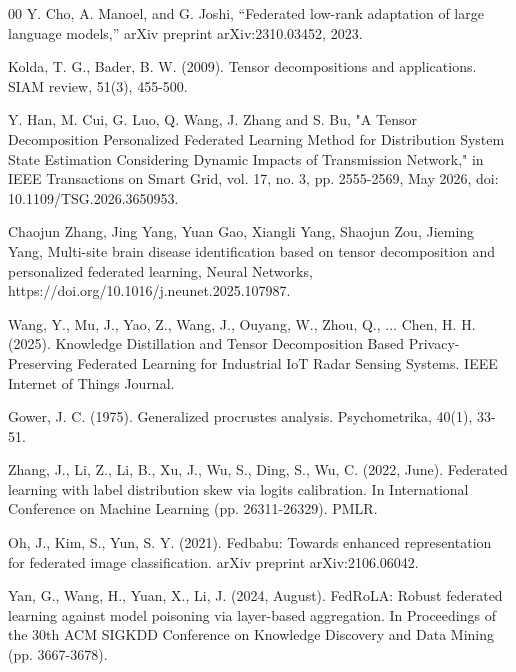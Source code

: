 \documentclass[conference]{IEEEtran}
\begin{document}
\begin{thebibliography}{00}
    Y. Cho, A. Manoel, and G. Joshi, ``Federated low-rank adaptation of large language models,'' arXiv preprint arXiv:2310.03452, 2023.
    
    Kolda, T. G., Bader, B. W. (2009). Tensor decompositions and applications. SIAM review, 51(3), 455-500.
    
    Y. Han, M. Cui, G. Luo, Q. Wang, J. Zhang and S. Bu, "A Tensor Decomposition Personalized Federated Learning Method for Distribution System State Estimation Considering Dynamic Impacts of Transmission Network," in IEEE Transactions on Smart Grid, vol. 17, no. 3, pp. 2555-2569, May 2026, doi: 10.1109/TSG.2026.3650953.
    
    Chaojun Zhang, Jing Yang, Yuan Gao, Xiangli Yang, Shaojun Zou, Jieming Yang, Multi-site brain disease identification based on tensor decomposition and personalized federated learning, Neural Networks, https://doi.org/10.1016/j.neunet.2025.107987.
    
    Wang, Y., Mu, J., Yao, Z., Wang, J., Ouyang, W., Zhou, Q., ... Chen, H. H. (2025). Knowledge Distillation and Tensor Decomposition Based Privacy-Preserving Federated Learning for Industrial IoT Radar Sensing Systems. IEEE Internet of Things Journal.
    
    Gower, J. C. (1975). Generalized procrustes analysis. Psychometrika, 40(1), 33-51.
    
    Zhang, J., Li, Z., Li, B., Xu, J., Wu, S., Ding, S., Wu, C. (2022, June). Federated learning with label distribution skew via logits calibration. In International Conference on Machine Learning (pp. 26311-26329). PMLR.
    
    Oh, J., Kim, S., Yun, S. Y. (2021). Fedbabu: Towards enhanced representation for federated image classification. arXiv preprint arXiv:2106.06042.
    
    Yan, G., Wang, H., Yuan, X., Li, J. (2024, August). FedRoLA: Robust federated learning against model poisoning via layer-based aggregation. In Proceedings of the 30th ACM SIGKDD Conference on Knowledge Discovery and Data Mining (pp. 3667-3678).
    
    
    

\end{thebibliography}
\end{document}
